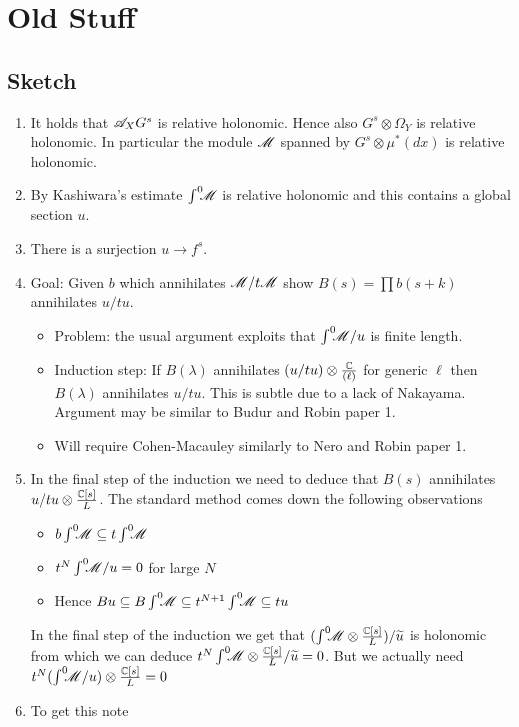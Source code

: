 \section{Old Stuff}
\subsection{Sketch}
\begin{enumerate}
  \item It holds that $\mathscr{A}_X G^s$ is relative holonomic. Hence also $G^s \otimes \Omega_Y$ is relative holonomic. In particular the module $\mathscr{M}$ spanned by $G^s \otimes \mu^*(dx)$ is relative holonomic.
  \item By Kashiwara's estimate $\int^0 \mkern -8mu \mathscr{M}$ is relative holonomic and this contains a global section $u$.
  \item There is a surjection $u\to f^s$.
  \item Goal: Given $b$ which annihilates $\mathscr{M}/t\mathscr{M}$ show $B(s) = \prod b(s + k)$ annihilates $u/tu$.
  \begin{itemize}
    \item Problem: the usual argument exploits that $\int^0 \mkern -8mu \mathscr{M} /u$ is finite length.
    \item Induction step: If $B(\lambda)$ annihilates $(u/tu)\otimes \frac{\mathbb{C}}{(\ell)}$ for generic $\ell$ then $B(\lambda)$ annihilates $u/tu$. This is subtle due to a lack of Nakayama. Argument may be similar to Budur and Robin paper 1.
    \item Will require Cohen-Macauley similarly to Nero and Robin paper 1.
  \end{itemize}
  \item In the final step of the induction we need to deduce that $B(s)$ annihilates $u/tu \otimes \frac{\mathbb{C}[s]}{L}$. The standard method comes down the following observations
  \begin{itemize}
    \item $b \int^0 \mkern -8mu \mathscr{M} \subseteq t\int^0 \mkern -8mu\mathscr{M}$
    \item $t^N\int^0 \mkern -8mu\mathscr{M} / u = 0$ for large $N$
    \item Hence $Bu \subseteq B\int^0 \mkern -8mu\mathscr{M} \subseteq t^{N+1}\int^0 \mkern -8mu \mathscr{M} \subseteq tu$
  \end{itemize}
  In the final step of the induction we get that $(\int^0 \mkern -8mu\mathscr{M} \otimes \frac{\mathbb{C}[s]}{L}) / \widetilde{u}$ is holonomic from which we can deduce $t^N \int^0 \mkern -8mu \mathscr{M} \otimes \frac{\mathbb{C}[s]}{L} / \widetilde{u} = 0$. But we actually need $t^N (\int^0 \mkern -8mu\mathscr{M}/ u) \otimes \frac{\mathbb{C}[s]}{L} = 0$
  \item To get this note
  \begin{itemize}

\end{itemize}
\end{enumerate}
